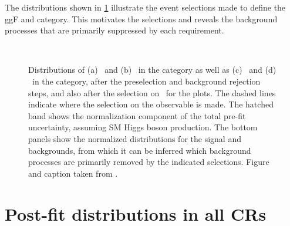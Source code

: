     The distributions shown in \cref{fig:ggf:Plots:selections} illustrate the event selections made to define the ggF \ZeroJet and \OneJet category. This motivates the selections and reveals the background processes that are primarily suppressed by each requirement.

    \begin{figure}[!h]
        \centering
         \\
        \caption{
            Distributions of (a) \mll\ and (b) \dphill\ in the \ZeroJet category as well as (c) \mll\ and (d) \dphill\ in the \OneJet category, after the preselection and background rejection steps, and also after the selection on \mll\ for the \dphill plots. The dashed lines indicate where the selection on the observable is made. The hatched band shows the normalization component of the total pre-fit uncertainty, assuming SM Higgs boson production. The bottom panels show the normalized distributions for the signal and backgrounds, from which it can be inferred which background processes are primarily removed by the indicated selections.
            Figure and caption taken from .
            \label{fig:ggf:Plots:selections}
        }
    \end{figure}

    \clearpage
    \FloatBarrier
    \section{Post-fit distributions in all CRs}
    \label{app:post-fit-cr-dists}

